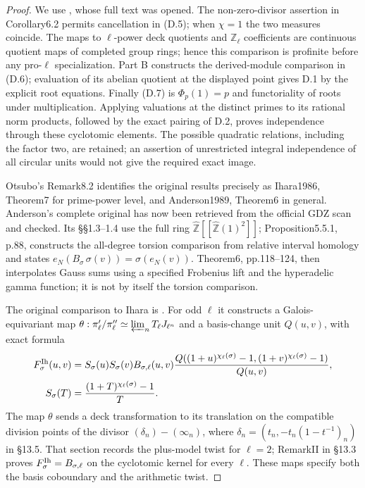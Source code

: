 \begin{proof}
We use \cite[Theorem6.1, Corollary6.2, equation(7.2)]{Otsubo2016}, whose full text was opened. The non-zero-divisor assertion in Corollary6.2 permits cancellation in (D.5); when $\chi=1$ the two measures coincide. The maps to $\ell$-power deck quotients and $\mathbb Z_\ell$ coefficients are continuous quotient maps of completed group rings; hence this comparison is profinite before any pro-$\ell$ specialization. Part B constructs the derived-module comparison in (D.6); evaluation of its abelian quotient at the displayed point gives D.1 by the explicit root equations. Finally (D.7) is $\Phi_p(1)=p$ and functoriality of roots under multiplication. Applying valuations at the distinct primes to its rational norm products, followed by the exact pairing of D.2, proves independence through these cyclotomic elements. The possible quadratic relations, including the factor two, are retained; an assertion of unrestricted integral independence of all circular units would not give the required exact image.

Otsubo's Remark8.2 identifies the original results precisely as Ihara1986, Theorem7 for prime-power level, and Anderson1989, Theorem6 in general. Anderson's complete original has now been retrieved from the official GDZ scan and checked. Its \S\S1.3--1.4 use the full ring
$\widehat{\mathbb Z}[[\widehat{\mathbb Z}(1)^2]]$;
Proposition5.5.1, p.88, constructs the all-degree torsion comparison from relative interval homology and states
$e_N(B_\sigma\,\sigma(v))=\sigma(e_N(v))$.
Theorem6, pp.118--124, then interpolates Gauss sums using a specified Frobenius lift and the hyperadelic gamma function; it is not by itself the torsion comparison.

The original comparison to Ihara is \cite[Proposition13.3.2 and \S\S13.4--13.6]{dAnderson1989}.
For odd $\ell$ it constructs a Galois-equivariant map
$\theta:\pi_\ell'/\pi_\ell''\simeq
\varprojlim_n T_\ell J_{\ell^n}$ and a basis-change unit
$Q(u,v)$, with exact formula
\[
\begin{aligned}
 F^{\rm Ih}_\sigma(u,v)&=S_\sigma(u)S_\sigma(v)
 B_{\sigma,\ell}(u,v)
 \frac{Q((1+u)^{\chi_\ell(\sigma)}-1,
          (1+v)^{\chi_\ell(\sigma)}-1)}{Q(u,v)},\\
 S_\sigma(T)&=\frac{(1+T)^{\chi_\ell(\sigma)}-1}{T}.
\end{aligned}
\]
The map $\theta$ sends a deck transformation to its translation
on the compatible division points of the divisor
$(\delta_n)-(\infty_n)$, where
$\delta_n=(t_n,-t_n(1-t^{-1})_n)$ in \S13.5.
That section records the plus-model twist for $\ell=2$;
RemarkII in \S13.3 proves $F^{\rm Ih}_\sigma=B_{\sigma,\ell}$
on the cyclotomic kernel for every $\ell$.
These maps specify both the basis coboundary and the arithmetic twist.


\end{proof}
